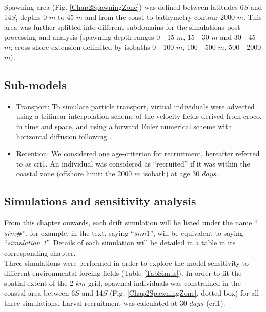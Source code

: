 Spawning area (Fig. \ref{Chap2SpawningZone}) was defined between latitudes 6\textdegree $S$ and 14\textdegree $S$, depths 0 $m$ to 45 $m$ and from the coast to bathymetry contour 2000 $m$. This area was further splitted into different subdomains for the simulations post-processing and analysis (spawning depth ranges 0 - 15 $m$, 15 - 30 $m$ and 30 - 45 $m$; cross-shore extension delimited by isobaths 0 - 100 $m$, 100 - 500 $m$, 500 - 2000 $m$).\\

\subsection{Sub-models}\label{Chap2MethSubMod}

\begin{itemize}

\item Transport: To simulate particle transport, virtual individuals were advected using a trilinear interpolation scheme of the velocity fields derived from \acrshort{croco}, in time and space, and using a forward Euler numerical scheme with horizontal diffusion following \cite{PeliMarc2007}.\\

\item Retention: We considered one age-criterion for recruitment, hereafter referred to as \gls{cri1}. An individual was considered as ``recruited'' if it was within the coastal zone (offshore limit: the 2000 $m$ isobath) at age 30 $days$.\\

\end{itemize}

\subsection{Simulations and sensitivity analysis}\label{Chap2MethSimSens}

From this chapter onwards, each drift simulation will be listed under the name ``\textbf{$sim \#$}'', for example, in the text, saying ``$sim 1$'', will be equivalent to saying ``\textit{simulation 1}''. Details of each simulation will be detailed in a table in its corresponding chapter.\\

Three simulations were performed in order to explore the model sensitivity to different environmental forcing fields (Table \ref{TabSimus}). In order to fit the spatial extent of the 2 $km$ grid, spawned individuals was constrained in the coastal area between 6\textdegree $S$ and 14\textdegree $S$ (Fig. \ref{Chap2SpawningZone}, dotted box) for all three simulations. Larval recruitment was calculated at 30 $days$ (\gls{cri1}).\\

